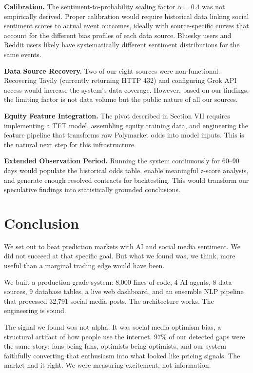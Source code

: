 \documentclass[conference]{IEEEtran}
\begin{document}
\textbf{Calibration.} The sentiment-to-probability scaling factor $\alpha = 0.4$ was not empirically derived. Proper calibration would require historical data linking social sentiment scores to actual event outcomes, ideally with source-specific curves that account for the different bias profiles of each data source. Bluesky users and Reddit users likely have systematically different sentiment distributions for the same events.

\textbf{Data Source Recovery.} Two of our eight sources were non-functional. Recovering Tavily (currently returning HTTP 432) and configuring Grok API access would increase the system's data coverage. However, based on our findings, the limiting factor is not data volume but the public nature of all our sources.

\textbf{Equity Feature Integration.} The pivot described in Section VII requires implementing a TFT model, assembling equity training data, and engineering the feature pipeline that transforms raw Polymarket odds into model inputs. This is the natural next step for this infrastructure.

\textbf{Extended Observation Period.} Running the system continuously for 60--90 days would populate the historical odds table, enable meaningful z-score analysis, and generate enough resolved contracts for backtesting. This would transform our speculative findings into statistically grounded conclusions.

\section{Conclusion}

We set out to beat prediction markets with AI and social media sentiment. We did not succeed at that specific goal. But what we found was, we think, more useful than a marginal trading edge would have been.

We built a production-grade system: 8,000 lines of code, 4 AI agents, 8 data sources, 9 database tables, a live web dashboard, and an ensemble NLP pipeline that processed 32,791 social media posts. The architecture works. The engineering is sound.

The signal we found was not alpha. It was social media optimism bias, a structural artifact of how people use the internet. 97\% of our detected gaps were the same story: fans being fans, optimists being optimists, and our system faithfully converting that enthusiasm into what looked like pricing signals. The market had it right. We were measuring excitement, not information.
\end{document}
